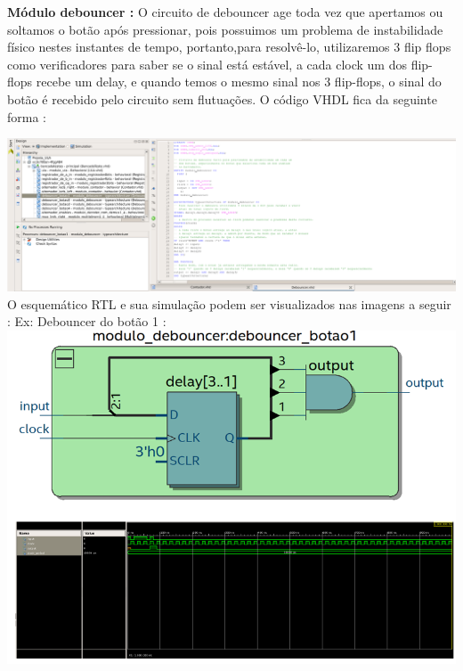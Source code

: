 \documentclass[11pt]{book}
\begin{document}
\textbf{Módulo debouncer :} 
\newline\newline
O circuito de debouncer age toda vez que apertamos ou soltamos o botão após pressionar, pois possuimos um problema de instabilidade físico nestes instantes de tempo, portanto,para resolvê-lo,  utilizaremos 3 flip flops como verificadores para saber se o sinal está estável, a cada clock um dos flip-flops recebe um delay, e quando temos o mesmo sinal nos 3 flip-flops, o sinal do botão é recebido pelo circuito sem flutuações.
\newline
O código VHDL fica da seguinte forma :

\includegraphics[width=1.1\textwidth]{codigo_debouncer.png}%
\newline
O esquemático RTL e sua simulação podem ser visualizados nas imagens a seguir :
\newline
Ex: Debouncer do botão 1 :
\newline
\includegraphics[width=1.1\textwidth]{RTL_botao1_debouncer_simulacao_debouncer.png}%
\newline\newline
\end{document}
